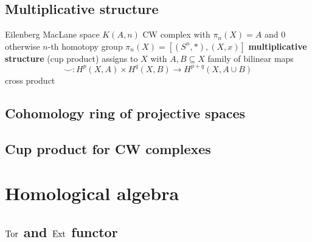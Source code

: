 \subsection{Multiplicative structure}

\begin{outline}
    \1 Eilenberg MacLane space $K(A,n)$ 
        \2 CW complex with $\pi_n(X)=A$ and $0$ otherwise
    \1 $n$-th homotopy group $\pi_n(X)=[(S^n,*), (X,x)]$
    \1 \textbf{multiplicative structure} (cup product)
        \2 assigns to $X$ with $A,B\subseteq X$ family of bilinear maps $$\smile : H^p(X,A)\times H^q(X,B) \rightarrow H^{p+q}(X,A\cup B)$$
    \1 cross product
    
\end{outline}


\begin{outline}
    
\end{outline}

\subsection{Cohomology ring of projective spaces}

\subsection{Cup product for CW complexes}

\section{Homological algebra}

\subsection{$\operatorname{Tor}$ and $\operatorname{Ext}$ functor}


